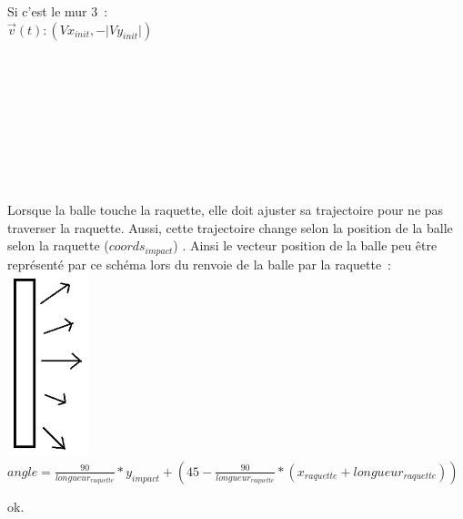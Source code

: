 \documentclass{report}
\begin{document}
Si c’est le mur 3 :\\
$\vec{v}(t):(Vx_{init},-\lvert Vy_{init} \rvert)$\\
\\
\\
\\
\\
\\
\\
\\
\\
\\
Lorsque la balle touche la raquette, elle doit ajuster sa trajectoire pour ne pas traverser la raquette. Aussi, cette trajectoire change selon la position de la balle selon la raquette ($coords_{impact}$) . Ainsi le vecteur position de la balle peu être représenté par ce schéma lors du renvoie de la balle par la raquette : \\
\includegraphics{raquette}\\

$angle = \frac{90}{longueur_{raquette}}*y_{impact}+(45-\frac{90}{longueur_{raquette}}*(x_{raquette}+longueur_{raquette}))$


ok.
\end{document}
